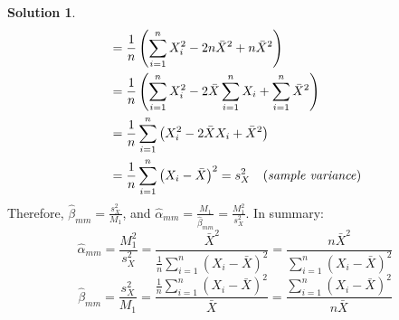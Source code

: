 \documentclass[a4paper, 10pt]{article}
\theoremstyle{definition}
\theoremstyle{hSol}
\newtheorem*{solution}{Solution}
\begin{document}
\begin{solution}
\begin{equation}
\begin{split}
    &=\frac{1}{n}\left(\sum_{i=1}^n X_i^2 - 2n\bar{X}^2 + n\bar{X}^2\right) \\
    &= \frac{1}{n}\left(\sum_{i=1}^n X_i^2 - 2\bar{X}\sum_{i=1}^n X_i + \sum_{i=1}^n\bar{X}^2\right) \\
    &= \frac{1}{n}\sum_{i=1}^n\left(X_i^2 - 2\bar{X} X_i + \bar{X}^2\right) \\
    &= \frac{1}{n}\sum_{i=1}^n\left(X_i - \bar{X}\right)^2 = s^2_X~~~\text{(\textit{sample variance})}
  \end{split}
\end{equation}
Therefore, $\hat{\beta}_{mm} = \frac{s_X^2}{M_1}$, and $\hat{\alpha}_{mm} = \frac{M_1}{\hat{\beta}_{mm}} = \frac{M_1^2}{s_X^2}$. In summary:
\begin{equation}
  \hat{\alpha}_{mm} = \frac{M_1^2}{s_X^2} = \frac{\bar{X}^2}{\frac{1}{n}\sum_{i=1}^n(X_i - \bar{X})^2} = \frac{n \bar{X}^2}{\sum_{i=1}^n(X_i - \bar{X})^2}
\end{equation}
\begin{equation}
  \hat{\beta}_{mm} = \frac{s_X^2}{M_1} = \frac{\frac{1}{n}\sum_{i=1}^n(X_i - \bar{X})^2}{\bar{X}} =  \frac{\sum_{i=1}^n(X_i - \bar{X})^2}{n\bar{X}} 
\end{equation}

\end{solution}
\end{document}
